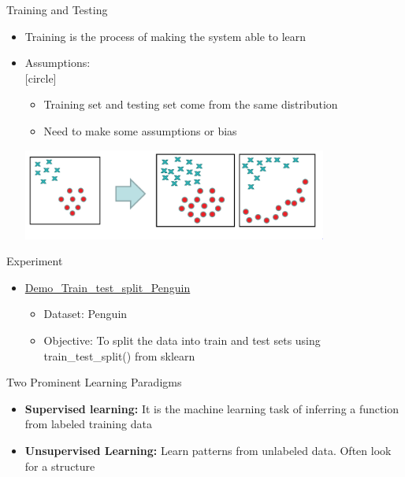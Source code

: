 \documentclass[aspectratio=169, 14pt,usenames,dvipsnames]{beamer}
\begin{document}
\begin{frame}{Training and Testing}
\begin{itemize}
\item Training is the process of making the system able to learn
\item \alert{Assumptions:} \\
[circle]
\begin{itemize}
\item Training set and testing set come from the same distribution
\item Need to make some assumptions or bias
\end{itemize}
\includegraphics[width=10cm]{Images/deeper_look_12.png}
\end{itemize}
\end{frame}

\begin{frame}{Experiment}
	\begin{itemize}
		\item \href{https://drive.google.com/file/d/1mOFaciz7MuvR9oZ2tAEPwSPfCn-ljVzo/view?usp=sharing}{Demo\_Train\_test\_split\_Penguin} \\
			\begin{itemize}
				\item Dataset: Penguin \\
				\item Objective: To split the data into train and test sets using  train\_test\_split() from sklearn
			\end{itemize}
	\end{itemize}
\end{frame}

\begin{frame}[t]{ Two Prominent Learning Paradigms}
\begin{itemize}
\item \textbf{\alert{Supervised learning:}} It is the machine learning task of inferring a function from labeled training data  \vspace{12pt}
\item \textbf{\alert{Unsupervised Learning:}} Learn patterns from unlabeled data. Often look for a structure
\end{itemize}
\end{frame}
\end{document}
